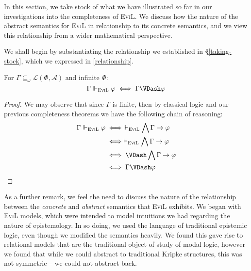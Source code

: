 In this section, we take stock of what we have illustrated so far in
our investigations into the completeness of \textsc{EviL}.  We discuss
how the nature of the abstract semantics for \textsc{EviL} in
relationship to its concrete semantics, and we view this relationship
from a wider mathematical perspective.

We shall begin by substantiating the relationship we established in
\S\ref{taking-stock}, which we expressed in \eqref{relationship}.

\begin{lemma}\label{coincide} For $\Gamma\subseteq_\omega \mathcal{L}(\Phi, \mathcal{A})$ and infinite $\Phi$:
\[
\Gamma \Vdash_{\textsc{EviL}} \phi \iff \Gamma \VDash \phi
\]
\end{lemma}
\begin{proof}
We may observe that since $\Gamma$ is finite, then by classical logic
and our previous completeness theorems we have the following chain of reasoning:
\begin{align*}
  \Gamma \Vdash_{\textsc{EviL}} \phi & \iff  \Vdash_{\textsc{EviL}} \bigwedge \Gamma
  \to \phi \\
   & \iff \vdash_{\textsc{EviL}} \bigwedge \Gamma
  \to \phi \\
   & \iff \VDash \bigwedge \Gamma
  \to \phi \\
   & \iff  \Gamma \VDash \phi
\end{align*}
\end{proof}

As a further remark, we feel the need to discuss the nature of the
relationship between the \emph{concrete} and \emph{abstract} semantics
that \textsc{EviL} exhibits.  We began with \textsc{EviL} models,
which were intended to model intuitions we had regarding the nature of
epistemology.  In so doing, we used the language of traditional 
epistemic logic, even though we modified the semantics heavily.  We
found this gave rise to relational models that are the traditional
object of study of modal logic, however we found that while we could
abstract to traditional Kripke structures, this was not symmetric --
we could not abstract back.

